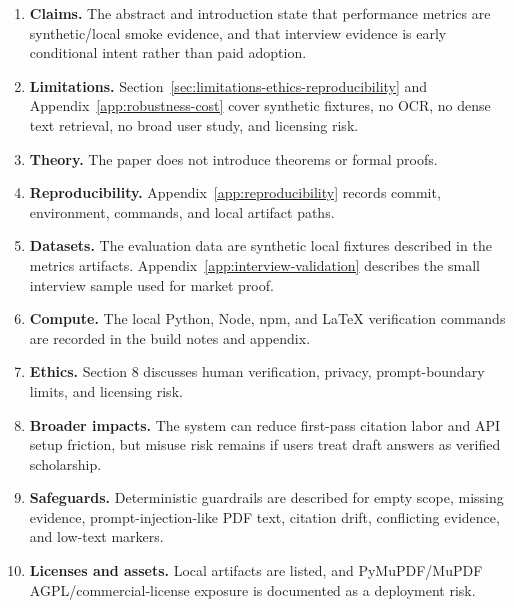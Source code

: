 \documentclass{article}
\begin{document}
\begin{enumerate}
\item \textbf{Claims.} \answerYes{} The abstract and introduction state that performance metrics are synthetic/local smoke evidence, and that interview evidence is early conditional intent rather than paid adoption.
\item \textbf{Limitations.} \answerYes{} Section~\ref{sec:limitations-ethics-reproducibility} and Appendix~\ref{app:robustness-cost} cover synthetic fixtures, no OCR, no dense text retrieval, no broad user study, and licensing risk.
\item \textbf{Theory.} \answerNA{} The paper does not introduce theorems or formal proofs.
\item \textbf{Reproducibility.} \answerYes{} Appendix~\ref{app:reproducibility} records commit, environment, commands, and local artifact paths.
\item \textbf{Datasets.} \answerYes{} The evaluation data are synthetic local fixtures described in the metrics artifacts. Appendix~\ref{app:interview-validation} describes the small interview sample used for market proof.
\item \textbf{Compute.} \answerYes{} The local Python, Node, npm, and LaTeX verification commands are recorded in the build notes and appendix.
\item \textbf{Ethics.} \answerYes{} Section 8 discusses human verification, privacy, prompt-boundary limits, and licensing risk.
\item \textbf{Broader impacts.} \answerYes{} The system can reduce first-pass citation labor and API setup friction, but misuse risk remains if users treat draft answers as verified scholarship.
\item \textbf{Safeguards.} \answerYes{} Deterministic guardrails are described for empty scope, missing evidence, prompt-injection-like PDF text, citation drift, conflicting evidence, and low-text markers.
\item \textbf{Licenses and assets.} \answerYes{} Local artifacts are listed, and PyMuPDF/MuPDF AGPL/commercial-license exposure is documented as a deployment risk.
\end{enumerate}
\end{document}
